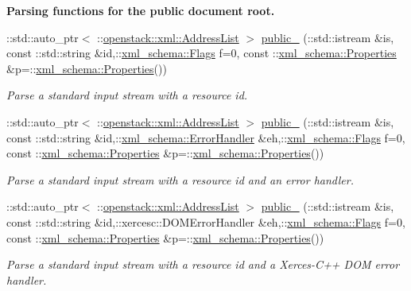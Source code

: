 \begin{Indent}{\bf Parsing functions for the public document root.}
\begin{DoxyCompactItemize}
::std::auto\_\-ptr$<$ ::\hyperlink{classopenstack_1_1xml_1_1AddressList}{openstack::xml::AddressList} $>$ \hyperlink{namespaceopenstack_1_1xml_a5f5f90c747b109551db5e21079bbeb9f}{public\_\-} (::std::istream \&is, const ::std::string \&id,::\hyperlink{namespacexml__schema_affb4c227cbd9aa7453dd1dc5a1401943}{xml\_\-schema::Flags} f=0, const ::\hyperlink{namespacexml__schema_ad27ce19a7ee1d3b1064092648898f64c}{xml\_\-schema::Properties} \&p=::\hyperlink{namespacexml__schema_ad27ce19a7ee1d3b1064092648898f64c}{xml\_\-schema::Properties}())
\begin{DoxyCompactList}\small\item\em Parse a standard input stream with a resource id. \item\end{DoxyCompactList}\item 
::std::auto\_\-ptr$<$ ::\hyperlink{classopenstack_1_1xml_1_1AddressList}{openstack::xml::AddressList} $>$ \hyperlink{namespaceopenstack_1_1xml_a76a2c86ea3f752da352cbcc69473b606}{public\_\-} (::std::istream \&is, const ::std::string \&id,::\hyperlink{namespacexml__schema_ab1c9361bfd3b404eaabf0c31eded79dc}{xml\_\-schema::ErrorHandler} \&eh,::\hyperlink{namespacexml__schema_affb4c227cbd9aa7453dd1dc5a1401943}{xml\_\-schema::Flags} f=0, const ::\hyperlink{namespacexml__schema_ad27ce19a7ee1d3b1064092648898f64c}{xml\_\-schema::Properties} \&p=::\hyperlink{namespacexml__schema_ad27ce19a7ee1d3b1064092648898f64c}{xml\_\-schema::Properties}())
\begin{DoxyCompactList}\small\item\em Parse a standard input stream with a resource id and an error handler. \item\end{DoxyCompactList}\item 
::std::auto\_\-ptr$<$ ::\hyperlink{classopenstack_1_1xml_1_1AddressList}{openstack::xml::AddressList} $>$ \hyperlink{namespaceopenstack_1_1xml_a1854337d91f5e73ede57bb76c33f7f76}{public\_\-} (::std::istream \&is, const ::std::string \&id,::xercesc::DOMErrorHandler \&eh,::\hyperlink{namespacexml__schema_affb4c227cbd9aa7453dd1dc5a1401943}{xml\_\-schema::Flags} f=0, const ::\hyperlink{namespacexml__schema_ad27ce19a7ee1d3b1064092648898f64c}{xml\_\-schema::Properties} \&p=::\hyperlink{namespacexml__schema_ad27ce19a7ee1d3b1064092648898f64c}{xml\_\-schema::Properties}())
\begin{DoxyCompactList}\small\item\em Parse a standard input stream with a resource id and a Xerces-\/C++ DOM error handler. \item\end{DoxyCompactList}\item 

\end{DoxyCompactItemize}
\end{Indent}
